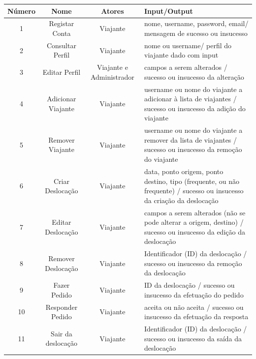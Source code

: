 \begin{table}[H]
\begin{center}
\begin{tabularx}{\textwidth}{ | c | c | c | X | }
    \hline
    Número & Nome & Atores & Input/Output \\
    
    \hline
    1 & Registar Conta & Viajante & nome, username, password, email/ mensagem de sucesso ou insucesso \\
    
    \hline
    2 & Consultar Perfil & Viajante & nome ou username/ perfil do viajante dado com input \\
    
    \hline
    3 & Editar Perfil & Viajante e Administrador & campos a serem alterados / sucesso ou insucesso da alteração \\
    
    \hline
    4 & Adicionar Viajante & Viajante & username ou nome do viajante a adicionar à lista de viajantes / sucesso ou insucesso da adição do viajante \\
    
    \hline
    5 & Remover Viajante & Viajante & username ou nome do viajante a remover da lista de viajantes / sucesso ou insucesso da remoção do viajante \\
    
    \hline
    6 & Criar Deslocação & Viajante & data, ponto origem, ponto destino, tipo (frequente, ou não frequente) / sucesso ou insucesso da criação da deslocação \\
    
    \hline
    7 & Editar Deslocação & Viajante & campos a serem alterados (não se pode alterar a origem, destino) / sucesso ou insucesso da edição da deslocação \\
    
    \hline
    8 & Remover Deslocação & Viajante & Identificador (ID) da deslocação / sucesso ou insucesso da remoção da deslocação \\
    
    \hline
    9 & Fazer Pedido & Viajante & ID da deslocação / sucesso ou insucesso da efetuação do pedido \\
    
    \hline
    10 & Responder Pedido & Viajante & aceita ou não aceita / sucesso ou insucesso da efetuação da resposta \\
    
    \hline
    11 & Sair da deslocação & Viajante & Identificador (ID) da deslocação / sucesso ou insucesso da saída da deslocação \\
    

\end{tabularx}
\end{center}
\end{table}

